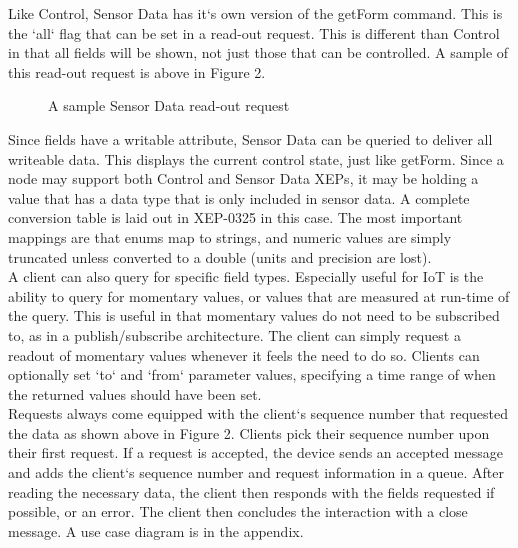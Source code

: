 Like Control, Sensor Data has it`s own version of the getForm command. This is the `all` flag that can be set in a read-out request. This is different than Control in that all fields will be shown, not just those that can be controlled. A sample of this read-out request is above in Figure 2.\\
\begin{figure}

\caption{A sample Sensor Data read-out request}
\end{figure}
Since fields have a writable attribute, Sensor Data can be queried to deliver all writeable data. This displays the current control state, just like getForm. Since a node may support both Control and Sensor Data XEPs, it may be holding a value that has a data type that is only included in sensor data. A complete conversion table is laid out in XEP-0325 in this case. The most important mappings are that enums map to strings, and numeric values are simply truncated unless converted to a double (units and precision are lost).\\
A client can also query for specific field types. Especially useful for IoT is the ability to query for momentary values, or values that are measured at run-time of the query. This is useful in that momentary values do not need to be subscribed to, as in a publish/subscribe architecture. The client can simply request a readout of momentary values whenever it feels the need to do so. Clients can optionally set `to` and `from` parameter values, specifying a time range of when the returned values should have been set.\\
Requests always come equipped with the client`s sequence number that requested the data as shown above in Figure 2. Clients pick their sequence number upon their first request. If a request is accepted, the device sends an accepted message and adds the client`s sequence number and request information in a queue. After reading the necessary data, the client then responds with the fields requested if possible, or an error. The client then concludes the interaction with a close message. A use case diagram is in the appendix.
